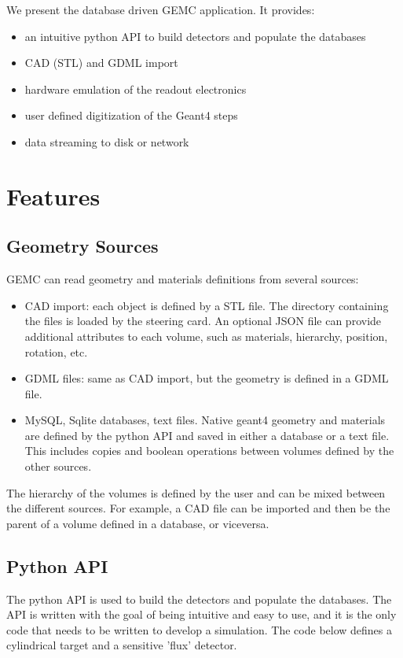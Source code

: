 We present the database driven GEMC\cite{clas12_gemc, gemc_homepage} application.
It provides:

\begin{itemize}
    \item an intuitive python API to build detectors and populate the databases
    \item CAD (STL) and GDML import
    \item hardware emulation of the readout electronics
    \item user defined digitization of the Geant4 steps
    \item data streaming to disk or network
\end{itemize}


\section{Features}
\label{sec:features}

\subsection{Geometry Sources}
\label{subsec:databases}
GEMC can read geometry and materials definitions from several sources:
\begin{itemize}
    \item CAD import: each object is defined by a STL file.
    The directory containing the files is loaded by the steering card.
    An optional JSON file can provide additional attributes to each volume,
    such as materials, hierarchy, position, rotation, etc.
    \item GDML files: same as CAD import, but the geometry is defined
    in a GDML file.
    \item MySQL, Sqlite databases, text files. Native geant4 geometry
    and materials are defined by the python API and saved in either
    a database or a text file. This includes copies and boolean operations
    between volumes defined by the other sources.
\end{itemize}
The hierarchy of the volumes is defined by the user and can be mixed between
the different sources. For example, a CAD file can be imported and then be the parent
of a volume defined in a database, or viceversa.

\subsection{Python API}
\label{subsec:api}
The python API is used to build the detectors and populate the databases.
The API is written with the goal of being intuitive and easy to use,
and it is the only code that needs to be written to  develop a simulation.
The code below defines a cylindrical target and a sensitive 'flux' detector.

